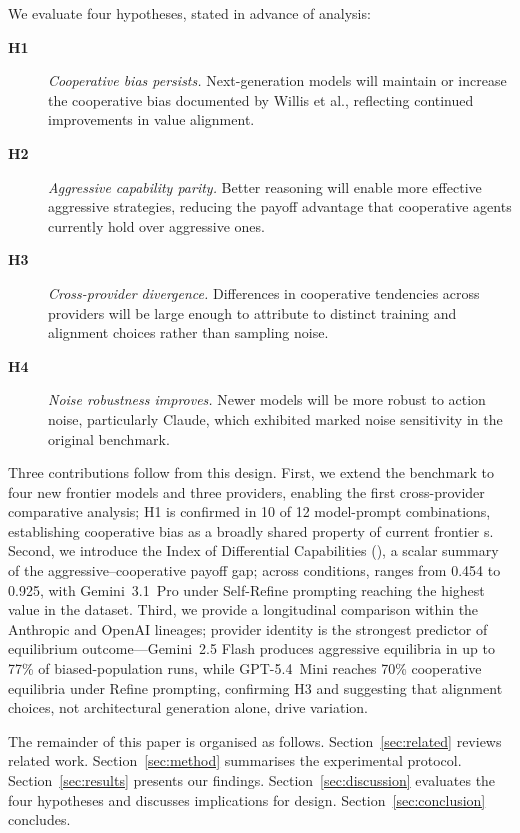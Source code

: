 We evaluate four hypotheses, stated in advance of analysis:
\begin{description}
  \item[\textbf{H1}] \emph{Cooperative bias persists.} Next-generation models
    will maintain or increase the cooperative bias documented by Willis et al.,
    reflecting continued improvements in value alignment.
  \item[\textbf{H2}] \emph{Aggressive capability parity.} Better reasoning will
    enable more effective aggressive strategies, reducing the payoff advantage
    that cooperative agents currently hold over aggressive ones.
  \item[\textbf{H3}] \emph{Cross-provider divergence.} Differences in cooperative
    tendencies across providers will be large enough to attribute to distinct
    training and alignment choices rather than sampling noise.
  \item[\textbf{H4}] \emph{Noise robustness improves.} Newer models will be
    more robust to action noise, particularly Claude, which exhibited marked
    noise sensitivity in the original benchmark.
\end{description}

Three contributions follow from this design. First, we extend the \citet{Willis2025_llm_ipd}
benchmark to four new frontier models and three providers, enabling the first
cross-provider comparative analysis; H1 is confirmed in 10 of 12 model-prompt
combinations, establishing cooperative bias as a broadly shared property of
current frontier \LLM{}s. Second, we introduce the Index of Differential
Capabilities (\ICD), a scalar summary of the aggressive--cooperative payoff gap;
across conditions, \ICD ranges from 0.454 to 0.925, with Gemini~3.1~Pro under
Self-Refine prompting reaching the highest value in the dataset. Third,
we provide a longitudinal comparison within the Anthropic and OpenAI lineages;
provider identity is the strongest predictor of equilibrium outcome---Gemini~2.5
Flash produces aggressive equilibria in up to 77\% of biased-population runs,
while GPT-5.4~Mini reaches 70\% cooperative equilibria under Refine prompting,
confirming H3 and suggesting that alignment choices, not architectural generation
alone, drive variation.

The remainder of this paper is organised as follows.
Section~\ref{sec:related} reviews related work.
Section~\ref{sec:method} summarises the experimental protocol.
Section~\ref{sec:results} presents our findings.
Section~\ref{sec:discussion} evaluates the four hypotheses and discusses
implications for \MAS design.
Section~\ref{sec:conclusion} concludes.
